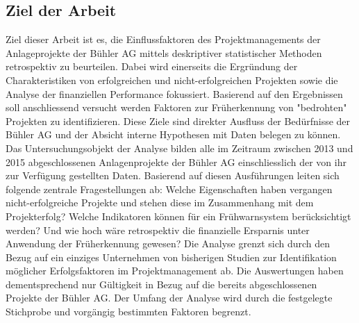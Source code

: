 \subsection{Ziel der Arbeit}
Ziel dieser Arbeit ist es, die Einflussfaktoren des Projektmanagements der Anlageprojekte der Bühler AG mittels deskriptiver statistischer Methoden retrospektiv zu beurteilen. Dabei wird einerseits die Ergründung der Charakteristiken von erfolgreichen und nicht-erfolgreichen Projekten sowie die Analyse der finanziellen Performance fokussiert. Basierend auf den Ergebnissen soll anschliessend versucht werden Faktoren zur Früherkennung von "bedrohten" Projekten zu identifizieren. Diese Ziele sind direkter Ausfluss der Bedürfnisse der Bühler AG und der Absicht interne Hypothesen mit Daten belegen zu können. Das Untersuchungsobjekt der Analyse bilden alle im Zeitraum zwischen 2013 und 2015 abgeschlossenen Anlagenprojekte der Bühler AG einschliesslich der von ihr zur Verfügung gestellten Daten. Basierend auf diesen Ausführungen leiten sich folgende zentrale Fragestellungen ab:
\newline\newline
Welche Eigenschaften haben vergangen nicht-erfolgreiche Projekte und stehen diese im Zusammenhang mit dem Projekterfolg? Welche Indikatoren können für ein Frühwarnsystem berücksichtigt werden? Und wie hoch wäre retrospektiv die finanzielle Ersparnis unter Anwendung der Früherkennung gewesen?
\newline\newline
Die Analyse grenzt sich durch den Bezug auf ein einziges Unternehmen von bisherigen Studien zur Identifikation möglicher Erfolgsfaktoren im Projektmanagement ab. Die Auswertungen haben dementsprechend nur Gültigkeit in Bezug auf die bereits abgeschlossenen Projekte der Bühler AG. Der Umfang der Analyse wird durch die festgelegte Stichprobe und vorgängig bestimmten Faktoren begrenzt.
